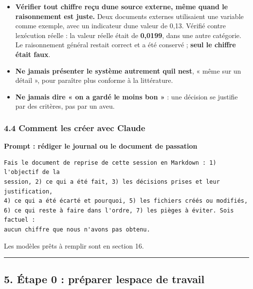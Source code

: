 \documentclass[
  french,
  11pt,
  a4paper,
]{article}
\providecommand{\tightlist}{%
  \setlength{\itemsep}{0pt}\setlength{\parskip}{0pt}}
\begin{document}
\begin{itemize}
\tightlist
\item
  \textbf{Vérifier tout chiffre reçu d\textquotesingle une source
  externe, même quand le raisonnement est juste.} Deux documents
  externes utilisaient une variable comme exemple, avec un indicateur
  d\textquotesingle une valeur de 0,13. Vérifié contre
  l\textquotesingle exécution réelle : la valeur réelle était de
  \textbf{0,0199}, dans une autre catégorie. Le raisonnement général
  restait correct et a été conservé ; \textbf{seul le chiffre était
  faux}.
\item
  \textbf{Ne jamais présenter le système autrement qu\textquotesingle il
  n\textquotesingle est}, « même sur un détail », pour paraître plus
  conforme à la littérature.
\item
  \textbf{Ne jamais dire « on a gardé le moins bon »} : une décision se
  justifie par des critères, pas par un aveu.
\end{itemize}

\subsubsection{4.4 Comment les créer avec
Claude}\label{44-comment-les-cruxe9er-avec-claude}

\textbf{Prompt : rédiger le journal ou le document de passation}

\begin{Verbatim}[breaklines=true,breakanywhere=true,fontsize=\small,frame=leftline,framerule=1.6pt,rulecolor=\color{credixblue},framesep=3mm,xleftmargin=2mm,xrightmargin=1mm]
Fais le document de reprise de cette session en Markdown : 1) l'objectif de la
session, 2) ce qui a été fait, 3) les décisions prises et leur justification,
4) ce qui a été écarté et pourquoi, 5) les fichiers créés ou modifiés,
6) ce qui reste à faire dans l'ordre, 7) les pièges à éviter. Sois factuel :
aucun chiffre que nous n'avons pas obtenu.
\end{Verbatim}

Les modèles prêts à remplir sont en section 16.

\begin{center}\rule{0.5\linewidth}{0.5pt}\end{center}

\subsection{5. Étape 0 : préparer l\textquotesingle espace de
travail}\label{5-uxe9tape-0--pruxe9parer-lespace-de-travail}
\end{document}
